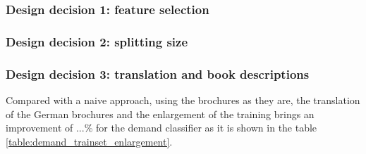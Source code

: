 \subsubsection{Design decision 1: feature selection}

\subsubsection{Design decision 2: splitting size}

\subsubsection{Design decision 3: translation and book descriptions}

Compared with a naive approach, using the brochures as they are, the translation of the German brochures and the enlargement of the training brings an improvement of ...\% for the demand classifier as it is shown in the table \ref{table:demand_trainset_enlargement}.

\endinput
\begin{itemize}
	\item Introduce our data set (show numbers, show examples)
	\item How we got our training data (everything at least twice, use the demands for learning, use the products for evaluation, Active Learning approach)
	\item Reference Precision/Recall from above again, final
	\item Evaluate of the training data generation, which approach is best (random, grouping)
\end{itemize}



